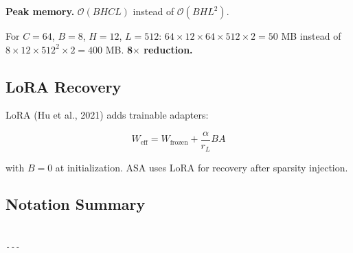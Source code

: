 \textbf{Peak memory.} $\mathcal{O}(B H C L)$ instead of $\mathcal{O}(B H L^2)$.

For $C = 64$, $B = 8$, $H = 12$, $L = 512$: $64 \times 12 \times 64 \times 512 \times 2 = 50$ MB 
instead of $8 \times 12 \times 512^2 \times 2 = 400$ MB. \textbf{8$\times$ reduction.}

\subsection{LoRA Recovery}

LoRA (Hu et al., 2021) adds trainable adapters:

\[
W_\text{eff} = W_\text{frozen} + \frac{\alpha}{r_L} B A
\]

with $B = 0$ at initialization. ASA uses LoRA for recovery after sparsity 
injection.

\subsection{Notation Summary}

\begin{lstlisting}

---
\end{lstlisting}